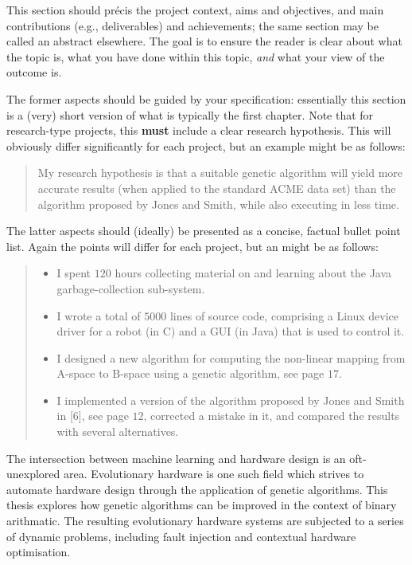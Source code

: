 \noindent
{
	\color{red}
This section should pr\'{e}cis the project context, aims and objectives,
and main contributions (e.g., deliverables) and achievements; the same
section may be called an abstract elsewhere.  The goal is to ensure the
reader is clear about what the topic is, what you have done within this
topic, {\em and} what your view of the outcome is.

The former aspects should be guided by your specification: essentially
this section is a (very) short version of what is typically the first
chapter.  Note that for research-type projects, this {\bf must} include
a clear research hypothesis.  This will obviously differ significantly
for each project, but an example might be as follows:

\begin{quote}
My research hypothesis is that a suitable genetic algorithm will yield
more accurate results (when applied to the standard ACME data set) than
the algorithm proposed by Jones and Smith, while also executing in less
time.
\end{quote}

\noindent
The latter aspects should (ideally) be presented as a concise, factual
bullet point list.  Again the points will differ for each project, but
an might be as follows:

\begin{quote}
\noindent
\begin{itemize}
\item I spent $120$ hours collecting material on and learning about the
      Java garbage-collection sub-system.
\item I wrote a total of $5000$ lines of source code, comprising a Linux
      device driver for a robot (in C) and a GUI (in Java) that is
      used to control it.
\item I designed a new algorithm for computing the non-linear mapping
      from A-space to B-space using a genetic algorithm, see page $17$.
\item I implemented a version of the algorithm proposed by Jones and
      Smith in [6], see page $12$, corrected a mistake in it, and
      compared the results with several alternatives.
\end{itemize}
\end{quote}
}


The intersection between machine learning and hardware design is an oft-unexplored
area. Evolutionary hardware is one such field which strives
to automate hardware design through the application of genetic algorithms.
This thesis
explores how genetic algorithms can be improved in the context
of binary arithmatic.
The resulting evolutionary hardware systems are subjected to a series of
dynamic problems, including fault injection and contextual hardware optimisation.

